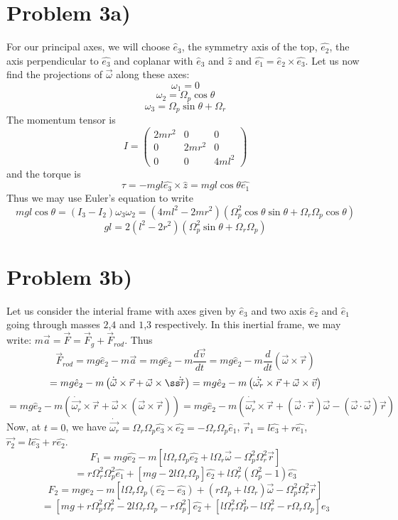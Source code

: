 \section*{Problem 3a)}
For our principal axes, we will choose $\hat{e}_3$, the symmetry axis of the top, $\hat{e_2}$, the axis perpendicular to $\hat{e_3}$ and coplanar with $\hat{e}_3$ and $\hat{z}$ and $\hat{e_1} = \hat{e}_2\times \hat{e_3}$. Let us now find the projections of $\vec{\omega}$ along these axes:
\[ \omega_1 = 0 \]
\[ \omega_2 = \Omega_p\cos\theta \]
\[ \omega_3 = \Omega_p\sin\theta + \Omega_r\]
The momentum tensor is 
\[
I = \begin{pmatrix}
2mr^2&0&0\\
0&2mr^2&0\\
0&0&4ml^2
\end{pmatrix}
\]
and the torque is
\[ \tau = -mgl \hat{e_3}\times\hat{z} = mgl \cos\theta \hat{e_1} \]
Thus we may use Euler's equation to write
\[ mgl\cos\theta = (I_3-I_2)\omega_3\omega_2 = (4ml^2-2mr^2)(\Omega_p^2\cos\theta\sin\theta + \Omega_r\Omega_p \cos\theta) \]
\[ gl = 2(l^2-2r^2)(\Omega_p^2\sin\theta+\Omega_r\Omega_p) \]
\section*{Problem 3b)}
Let us consider the interial frame with axes given by $\hat e_3$ and two axis $\hat e_2$ and $\hat e_1$ going through masses $2$,$4$ and $1$,$3$ respectively. In this inertial frame, we may write:
$m\vec{a} = \vec{F} = \vec F_g + \vec F_{rod}$. Thus
\[ \vec F_{rod} = mg\hat e_2 - m\vec{a} = mg\hat e_2 - m \frac{d\vec{v}}{dt} = mg \hat e_2 - m \frac{d}{dt} (\vec \omega \times \vec r) \]
\[ =  mg\hat e_2 - m \left( \dot{\vec \omega} \times \vec r + \vec{\omega} \timesß \dot \vec{r} \right) = mg\hat e_2 - m \left( \dot{\vec{\omega_r}} \times \vec r + \vec{\omega} \times \vec{v} \right) \]
\[ =  mg\hat e_2 - m \left( \dot{\vec{\omega_r}} \times \vec{r} + \vec{\omega} \times \left(\vec \omega\times \vec{r} \right)\right) = mg\hat e_2  -m \left( \dot{\vec{\omega_r}} \times \vec{r} + (\vec\omega\cdot \vec r) \vec\omega - (\vec\omega\cdot\vec\omega) \vec r \right) \]
Now, at $t=0$, we have $\dot{\vec{\omega_r}} = \Omega_r \Omega_p \hat{e_3} \times \hat{e_2} = - \Omega_r\Omega_p \hat e_1$, $\vec r_1 =  l\hat{e_3} + r\hat{e_1}$, $\vec{r_2} = l\hat{e_3} + r\hat{e_2}$.
\[ F_1 = mg\hat{e_2} - m \left[ l\Omega_r\Omega_p \hat{e_2} + l\Omega_r \vec \omega - \Omega_p^2\Omega_r^2 \vec{r}  \right]\]
\[ = r \Omega_r^2\Omega_p^2 \hat{e_1} + [mg-2l\Omega_r\Omega_p]\hat{e_2}  + l\Omega_r^2(\Omega_p^2-1)\hat{e_3} \]
\[ F_2 = mg\hat{e_2} - m\left[l\Omega_r\Omega_p(\hat{e_2}-\hat{e_3}) + (r\Omega_p+l\Omega_r)\vec \omega-\Omega_p^2\Omega_r^2\vec r \right] \]
\[ = [mg + r\Omega_p^2\Omega_r^2 - 2l\Omega_r\Omega_p - r\Omega_p^2 ] \hat{e_2} + [l\Omega_r^2\Omega_P^2-l\Omega_r^2-r \Omega_r\Omega_p]  \hat{e_3}  \]

